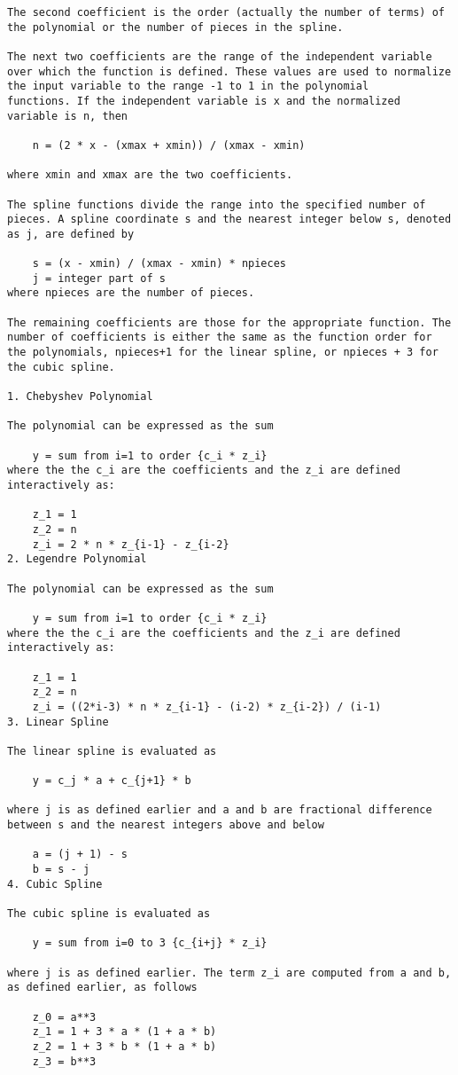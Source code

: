 \begin{verbatim}
The second coefficient is the order (actually the number of terms) of
the polynomial or the number of pieces in the spline.

The next two coefficients are the range of the independent variable
over which the function is defined. These values are used to normalize
the input variable to the range -1 to 1 in the polynomial
functions. If the independent variable is x and the normalized
variable is n, then

	n = (2 * x - (xmax + xmin)) / (xmax - xmin)

where xmin and xmax are the two coefficients.

The spline functions divide the range into the specified number of
pieces. A spline coordinate s and the nearest integer below s, denoted
as j, are defined by

	s = (x - xmin) / (xmax - xmin) * npieces
	j = integer part of s
where npieces are the number of pieces.

The remaining coefficients are those for the appropriate function. The
number of coefficients is either the same as the function order for
the polynomials, npieces+1 for the linear spline, or npieces + 3 for
the cubic spline.

1. Chebyshev Polynomial

The polynomial can be expressed as the sum

	y = sum from i=1 to order {c_i * z_i}
where the the c_i are the coefficients and the z_i are defined interactively as:

	z_1 = 1
	z_2 = n
	z_i = 2 * n * z_{i-1} - z_{i-2}
2. Legendre Polynomial

The polynomial can be expressed as the sum

	y = sum from i=1 to order {c_i * z_i}
where the the c_i are the coefficients and the z_i are defined interactively as:

	z_1 = 1
	z_2 = n
	z_i = ((2*i-3) * n * z_{i-1} - (i-2) * z_{i-2}) / (i-1)
3. Linear Spline

The linear spline is evaluated as

	y = c_j * a + c_{j+1} * b

where j is as defined earlier and a and b are fractional difference
between s and the nearest integers above and below

	a = (j + 1) - s
	b = s - j
4. Cubic Spline

The cubic spline is evaluated as

	y = sum from i=0 to 3 {c_{i+j} * z_i}

where j is as defined earlier. The term z_i are computed from a and b,
as defined earlier, as follows

	z_0 = a**3
	z_1 = 1 + 3 * a * (1 + a * b)
	z_2 = 1 + 3 * b * (1 + a * b)
	z_3 = b**3
\end{verbatim}
\endgroup


